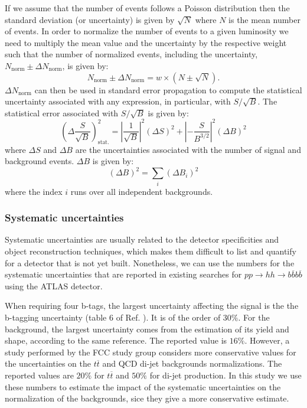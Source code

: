 If we assume that the number of events follows a Poisson distribution then the standard deviation (or uncertainty) is given by $\sqrt{N}$ where $N$ is the mean number of events. In order to normalize the number of events to a given luminosity we need to multiply the mean value and the uncertainty by the respective weight such that the number of normalized events, including the uncertainty, $N_{\text{norm}}\pm \Delta N_{\text{norm}}$, is given by:
\begin{equation}
	N_{\text{norm}}\pm \Delta N_{\text{norm}}=w\times \left(N \pm \sqrt{N}\right).
\end{equation}
$\Delta N_{\text{norm}}$ can then be used in standard error propagation to compute the statistical uncertainty associated with any expression, in particular, with $S/\sqrt{B}$. The statistical error associated with $S/\sqrt{B}$ is given by:
\begin{equation}
	\left(\Delta\frac{S}{\sqrt{B}}\right)_{\text{stat.}}^2=\left|\frac{1}{\sqrt{B}}\right|^2 (\Delta S)^2+\left|-\frac{S}{B^{3/2}}\right|^2 (\Delta B)^2
	\label{eq:stat}
\end{equation}
where $\Delta S$ and $\Delta B$ are the uncertainties associated with the number of signal and background events. $\Delta B$ is given by:
\begin{equation}
		(\Delta B)^2 =\sum_i (\Delta B_i)^2
\end{equation}
where the index $i$ runs over all independent backgrounds.

\subsubsection{Systematic uncertainties}
\label{sec:sys_unc}

Systematic uncertainties are usually related to the detector specificities and object reconstruction techniques, which makes them difficult to list and quantify for a detector that is not yet built. Nonetheless, we can use the numbers for the systematic uncertainties that are reported in existing searches for $pp\rightarrow hh\rightarrow b\overline{b}b\overline{b}$ using the ATLAS detector.

When requiring four b-tags, the largest uncertainty affecting the signal is the the b-tagging uncertainty (table 6 of Ref. \cite{hh2bbbbATLAS1}). It is of the order of $30\%$.
For the background, the largest uncertainty comes from the estimation of its yield and shape, according to the same reference. The reported value is $16\%$. However, a study performed by the FCC study group \cite{FCCphysClement} considers more conservative values for the uncertainties on the $t\overline{t}$ and  QCD di-jet backgrounds normalizations. The reported values are $20\%$ for $t\overline{t}$ and $50\%$ for di-jet production. In this study we use these numbers to estimate the impact of the systematic uncertainties on the normalization of the backgrounds, sice they give a more conservative estimate.

